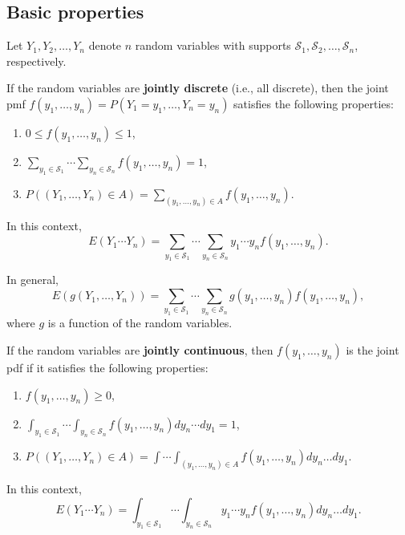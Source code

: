 \documentclass[
]{book}
\providecommand{\tightlist}{%
  \setlength{\itemsep}{0pt}\setlength{\parskip}{0pt}}
\theoremstyle{definition}
\theoremstyle{definition}
\theoremstyle{definition}
\theoremstyle{definition}
\theoremstyle{remark}
\begin{document}
\hypertarget{basic-properties}{%
\subsection{Basic properties}\label{basic-properties}}

Let \(Y_1,Y_2,\ldots,Y_n\) denote \(n\) random variables with supports \(\mathcal{S}_1,\mathcal{S}_2,\ldots,\mathcal{S}_n\), respectively.

If the random variables are \textbf{jointly discrete} (i.e., all discrete), then the joint pmf \(f(y_1,\ldots,y_n)=P(Y_1=y_1,\ldots,Y_n=y_n)\) satisfies the following properties:

\begin{enumerate}
\def\labelenumi{\arabic{enumi}.}
\tightlist
\item
  \(0\leq f(y_1,\ldots,y_n )\leq 1\),
\item
  \(\sum_{y_1\in\mathcal{S}_1}\cdots \sum_{y_n\in\mathcal{S}_n} f(y_1,\ldots,y_n ) = 1\),
\item
  \(P((Y_1,\ldots,Y_n)\in A)=\sum_{(y_1,\ldots,y_n) \in A} f(y_1,\ldots,y_n)\).
\end{enumerate}

In this context,
\[
E(Y_1 \cdots Y_n)=\sum_{y_1\in\mathcal{S}_1} \cdots \sum_{y_n\in\mathcal{S}_n}y_1 \cdots y_n  f(y_1,\ldots,y_n).
\]

In general,
\[
E(g(Y_1,\ldots,Y_n))=\sum_{y_1\in\mathcal{S}_1} \cdots \sum_{y_n\in\mathcal{S}_n} g(y_1, \ldots, y_n) f(y_1,\ldots,y_n),
\]
where \(g\) is a function of the random variables.

If the random variables are \textbf{jointly continuous}, then \(f(y_1,\ldots,y_n)\) is the joint pdf if it satisfies the following properties:

\begin{enumerate}
\def\labelenumi{\arabic{enumi}.}
\tightlist
\item
  \(f(y_1,\ldots,y_n ) \geq 0\),
\item
  \(\int_{y_1\in\mathcal{S}_1}\cdots \int_{y_n\in\mathcal{S}_n} f(y_1,\ldots,y_n ) dy_n \cdots dy_1 = 1\),
\item
  \(P((Y_1,\ldots,Y_n)\in A)=\int \cdots \int_{(y_1,\ldots,y_n) \in A} f(y_1,\ldots,y_n) dy_n\ldots dy_1\).
\end{enumerate}

In this context,
\[
E(Y_1 \cdots Y_n)=\int_{y_1\in\mathcal{S}_1} \cdots \int_{y_n\in\mathcal{S}_n} y_1 \cdots y_n  f(y_1,\ldots,y_n) dy_n \ldots dy_1.
\]
\end{document}
